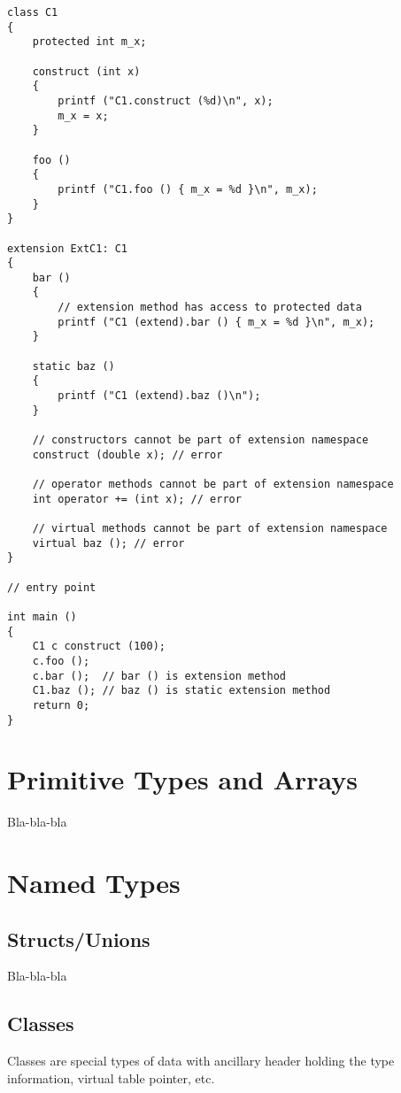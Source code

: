 \documentclass[oneside]{book}
\begin{document}
\begin{lstlisting}
class C1
{
    protected int m_x;

    construct (int x)
    {
        printf ("C1.construct (%d)\n", x);
        m_x = x;
    }

    foo ()
    {
        printf ("C1.foo () { m_x = %d }\n", m_x);
    }
}

extension ExtC1: C1
{
    bar ()
    {
        // extension method has access to protected data
        printf ("C1 (extend).bar () { m_x = %d }\n", m_x); 
    }

    static baz ()
    {
        printf ("C1 (extend).baz ()\n");
    }

    // constructors cannot be part of extension namespace
    construct (double x); // error

    // operator methods cannot be part of extension namespace
    int operator += (int x); // error

    // virtual methods cannot be part of extension namespace
    virtual baz (); // error
}

// entry point

int main ()
{
    C1 c construct (100);
    c.foo ();            
    c.bar ();  // bar () is extension method
    C1.baz (); // baz () is static extension method
    return 0;
}
\end{lstlisting}

\section{Primitive Types and Arrays}

Bla-bla-bla

\section{Named Types}

\subsection{Structs/Unions}

Bla-bla-bla

\subsection{Classes}

Classes are special types of data with ancillary header holding the type information, virtual table pointer, etc.
\end{document}
